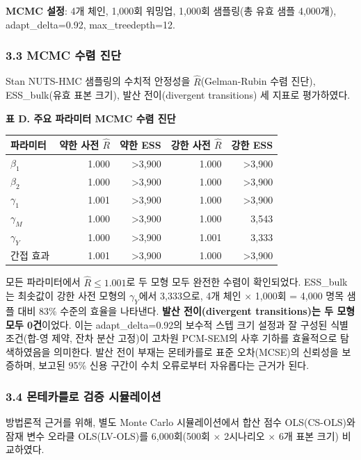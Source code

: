 \documentclass[a4paper,10pt]{oblivoir}
\begin{document}
\textbf{MCMC 설정}: 4개 체인, 1,000회 워밍업, 1,000회 샘플링(총 유효 샘플 4,000개), adapt\_delta=0.92, max\_treedepth=12.

\subsubsection{3.3 MCMC 수렴 진단}

Stan NUTS-HMC 샘플링의 수치적 안정성을 $\hat{R}$(Gelman-Rubin 수렴 진단), ESS\_bulk(유효 표본 크기), 발산 전이(divergent transitions) 세 지표로 평가하였다.


\noindent\textbf{표 D. 주요 파라미터 MCMC 수렴 진단}


\begin{table}[htbp]
\centering
\small
\begin{tabular}{lrrrr}
\toprule
파라미터 & 약한 사전 $\hat{R}$ & 약한 ESS & 강한 사전 $\hat{R}$ & 강한 ESS \\
\midrule
$\beta_1$ & 1.000 & >3,900 & 1.000 & >3,900 \\
$\beta_2$ & 1.000 & >3,900 & 1.000 & >3,900 \\
$\gamma_1$ & 1.001 & >3,900 & 1.000 & >3,900 \\
$\gamma_M$ & 1.000 & >3,900 & 1.000 & 3,543 \\
$\gamma_Y$ & 1.000 & >3,900 & 1.001 & 3,333 \\
간접 효과 & 1.001 & >3,900 & 1.000 & >3,900 \\
\bottomrule
\end{tabular}
\end{table}

모든 파라미터에서 $\hat{R} \leq 1.001$로 두 모형 모두 완전한 수렴이 확인되었다. ESS\_bulk는 최솟값이 강한 사전 모형의 $\gamma_Y$에서 3,333으로, 4개 체인 \ensuremath{\times} 1,000회 = 4,000 명목 샘플 대비 83\% 수준의 효율을 나타낸다. \textbf{발산 전이(divergent transitions)는 두 모형 모두 0건}이었다. 이는 adapt\_delta=0.92의 보수적 스텝 크기 설정과 잘 구성된 식별 조건(합-영 제약, 잔차 분산 고정)이 고차원 PCM-SEM의 사후 기하를 효율적으로 탐색하였음을 의미한다. 발산 전이 부재는 몬테카를로 표준 오차(MCSE)의 신뢰성을 보증하며, 보고된 95\% 신용 구간이 수치 오류로부터 자유롭다는 근거가 된다.

\subsubsection{3.4 몬테카를로 검증 시뮬레이션}

방법론적 근거를 위해, 별도 Monte Carlo 시뮬레이션에서 합산 점수 OLS(CS-OLS)와 잠재 변수 오라클 OLS(LV-OLS)를 6,000회(500회 \ensuremath{\times} 2시나리오 \ensuremath{\times} 6개 표본 크기) 비교하였다.
\end{document}
